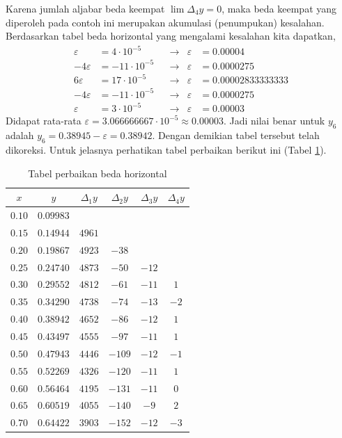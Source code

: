Karena jumlah aljabar beda keempat $\lim \Delta_4 y = 0$, maka beda keempat yang diperoleh pada contoh ini merupakan akumulasi (penumpukan) kesalahan. Berdasarkan tabel beda horizontal yang mengalami kesalahan kita dapatkan,
\begin{align*} 
\varepsilon &= 4\cdot 10^{-5} & & \rightarrow & \varepsilon &= 0.00004\\
-4\varepsilon &= -11\cdot 10^{-5} & &\rightarrow & \varepsilon &= 0.0000275\\
6\varepsilon &= 17\cdot 10^{-5} & &\rightarrow & \varepsilon &= 0.00002833333333\\
-4\varepsilon &= -11\cdot 10^{-5} & &\rightarrow & \varepsilon &= 0.0000275\\
\varepsilon &= 3\cdot 10^{-5} & &\rightarrow & \varepsilon &= 0.00003
\end{align*}
Didapat rata-rata $\varepsilon = 3.066666667 \cdot 10^{-5} \approx 0.00003$. Jadi nilai benar untuk $y_6$ adalah $y_6 = 0.38945 - \varepsilon = 0.38942$. Dengan demikian tabel tersebut telah dikoreksi. Untuk jelasnya perhatikan tabel perbaikan berikut ini (Tabel \ref{tabel:JawabanContohSoalKesalahanBedaHorizon}).

\begin{table}[!htbp]
\centering
\caption{Tabel perbaikan beda horizontal}
\label{tabel:JawabanContohSoalKesalahanBedaHorizon}
\begin{tabular}{@{}|c|c|c|c|c|c|@{}}
\hline
$x$ & $y$ & $\Delta_1 y$ & $\Delta_2 y$ & $\Delta_3 y$ & $\Delta_4 y$ \\[0.3ex]
\hline
$0.10$ & $0.09983$ & & & &\\[0.3ex]
$0.15$ & $0.14944$ & $4961$ & & & \\[0.3ex]
$0.20$ & $0.19867$ & $4923$ & $-38$ & &  \\[0.3ex]
$0.25$ & $0.24740$ & $4873$ & $-50$ & $-12$ & \\[0.3ex]
$0.30$ & $0.29552$ & $4812$ & $-61$ & $-11$ & $1$\\[0.3ex]
$0.35$ & $0.34290$ & $4738$ & $-74$ & $-13$ & $-2$\\[0.3ex]
$0.40$ & $0.38942$ & $4652$ & $-86$ & $-12$ & $1$\\[0.3ex]
$0.45$ & $0.43497$ & $4555$ & $-97$ & $-11$ & $1$\\[0.3ex]
$0.50$ & $0.47943$ & $4446$ & $-109$ & $-12$ & $-1$\\[0.3ex]
$0.55$ & $0.52269$ & $4326$ & $-120$ & $-11$ & $1$\\[0.3ex]
$0.60$ & $0.56464$ & $4195$ & $-131$ & $-11$ & $0$\\[0.3ex]
$0.65$ & $0.60519$ & $4055$ & $-140$ & $-9$ & $2$\\[0.3ex]
$0.70$ & $0.64422$ & $3903$ & $-152$ & $-12$ & $-3$\\[0.3ex]
\hline
\end{tabular}
\end{table}

